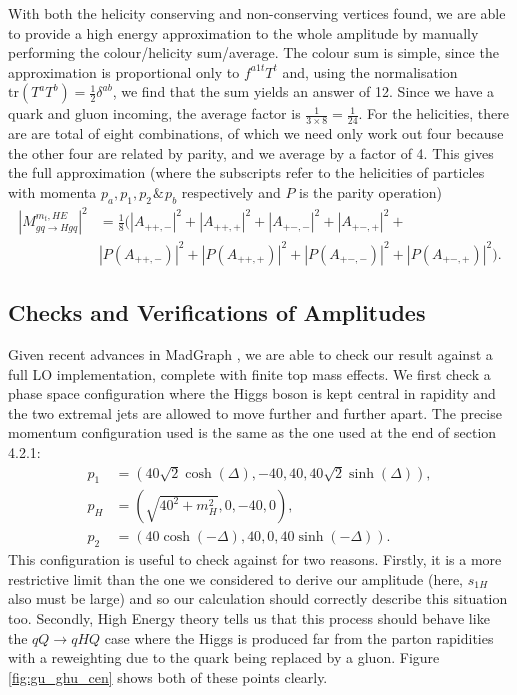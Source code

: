 With both the helicity conserving and non-conserving vertices found, we are able to provide a high energy approximation to the whole amplitude by manually performing the colour/helicity sum/average. The colour sum is simple, since the approximation is proportional only to $f^{a1t} T^t$ and, using the normalisation $\text{tr}(T^a T^b) = \frac{1}{2}\delta^{ab}$, we find that the sum yields an answer of 12. Since we have a quark and gluon incoming, the average factor is $\frac{1}{3 \times 8} = \frac{1}{24}$. For the helicities, there are are total of eight combinations, of which we need only work out four because the other four are related by parity, and we average by a factor of 4.  This gives the full approximation (where the subscripts refer to the helicities of particles with momenta $p_a,p_1,p_2 \hspace{1pt} \& \hspace{1pt} p_b$ respectively and $P$ is the parity operation)
\begin{equation}
\begin{split}
|M_{gq \to Hgq}^{m_t, HE}|^2 &= \frac{1}{8} \Big( |A_{++,-}|^2 + |A_{++,+}|^2 + |A_{+-,-}|^2 + |A_{+-,+}|^2 + \\
&|P(A_{++,-})|^2 + |P(A_{++,+})|^2 + |P(A_{+-,-})|^2 + |P(A_{+-,+})|^2 \Big).
\end{split}
\end{equation}

\subsection{Checks and Verifications of Amplitudes}

Given recent advances in MadGraph \cite{Alwall2007}, we are able to check our result against a full LO implementation, complete with finite top mass effects. We first check a phase space configuration where the Higgs boson is kept central in rapidity and the two extremal jets are allowed to move further and further apart. The precise momentum configuration used is the same as the one used at the end of section 4.2.1:
\begin{subequations}
\begin{align}
p_1 &= (40 \sqrt{2} \cosh(\Delta),-40,40,40 \sqrt{2} \sinh(\Delta)), \\
p_H &= (\sqrt{40^2+m_H^2}, 0,-40,0), \\
p_2 &= (40 \cosh(-\Delta),40,0,40 \sinh(-\Delta)).
\end{align}
\end{subequations}
This configuration is useful to check against for two reasons. Firstly, it is a more restrictive limit than the one we considered to derive our amplitude (here, $s_{1H}$ also must be large) and so our calculation should correctly describe this situation too. Secondly, High Energy theory tells us that this process should behave like the $qQ \to qHQ$ case where the Higgs is produced far from the parton rapidities with a reweighting due to the quark being replaced by a gluon. Figure \ref{fig:gu_ghu_cen} shows both of these points clearly. 

